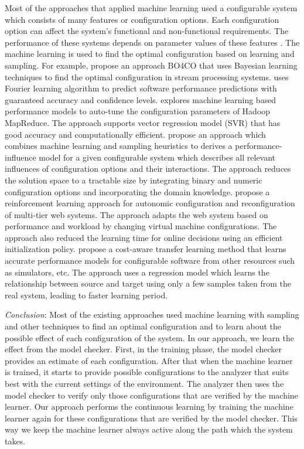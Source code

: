 \documentclass[a4paper,12pt]{article}
\begin{document}
Most of the approaches that applied machine learning used a configurable system which consists of many features or configuration options. Each configuration option can affect the system's functional and non-functional requirements. The performance of these systems depends on parameter values of these features \cite{CESFPPOCS-2015}. The machine learning is used to find the optimal configuration based on learning and sampling. For example, \cite{AUAATOCOSPS-2016} propose an approach BO4CO that uses Bayesian learning techniques to find the optimal configuration in stream processing systems. \cite{PPOCSSBFL-2015} uses Fourier learning algorithm to predict software performance predictions with guaranteed accuracy and confidence levels. \cite{TMLBATOMR-2013} explores machine learning based performance models to auto-tune the configuration parameters of Hadoop MapReduce. The approach supports vector regression model (SVR) that has good accuracy and computationally efficient. \cite{PIMFHCS-2015} propose an approach which combines machine learning and sampling heuristics to derives a performance-influence model for a given configurable system which describes all relevant influences of configuration options and their interactions. The approach reduces the solution space to a tractable size by integrating binary and numeric configuration options and incorporating the domain knowledge. \cite{ARLATOWSAC-2009}  propose a reinforcement learning approach for autonomic configuration and reconfiguration of multi-tier web systems. The approach adapts the web system based on performance and workload by changing virtual machine configurations. The approach also reduced the learning time for online decisions using an efficient initialization policy. \cite{TLFIMPIHCS-2017} propose a cost-aware transfer learning method that learns accurate performance models for configurable software from other resources such as simulators, etc. The approach uses a regression model which learns the relationship between source and target using only a few samples taken from the real system, leading to faster learning period.

\emph{Conclusion}: Most of the existing approaches used machine learning with sampling and other techniques to find an optimal configuration and to learn about the possible effect of each configuration of the system. In our approach, we learn the effect from the model checker. First, in the training phase, the model checker provides an estimate of each configuration. After that when the machine learner is trained, it starts to provide possible configurations to the analyzer that suits best with the current settings of the environment. The analyzer then uses the model checker to verify only those configurations that are verified by the machine learner. Our approach performs the continuous learning by training the machine learner again for these configurations that are verified by the model checker. This way we keep the machine learner always active along the path which the system takes.
\newpage
\end{document}
